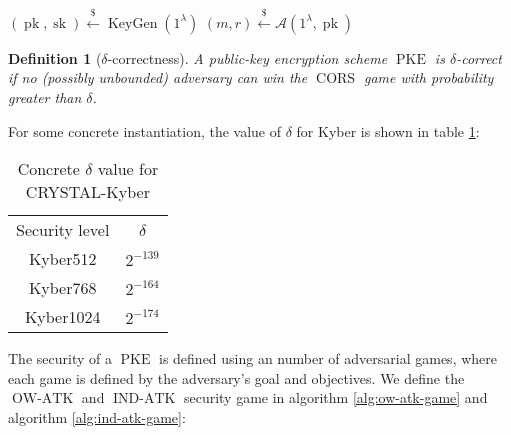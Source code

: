 \documentclass{article}
\newcommand{\leftsample}{\overset{{\scriptscriptstyle\$}}{\leftarrow}}
\newcommand{\keygen}{\operatorname{KeyGen}}
\newcommand{\pk}{\operatorname{pk}}
\newcommand{\sk}{\operatorname{sk}}
\newcommand{\pke}{\operatorname{PKE}}
\newcommand{\cors}{\operatorname{CORS}}
\newcommand{\llbrack}{[\![}
\newcommand{\rrbrack}{]\!]}
\newtheorem{definition}{Definition}[section]
\begin{document}
\begin{algorithm}[H]
    \caption{The correctness game $\cors$}
    $(\pk, \sk) \leftsample \keygen(1^\lambda)$\;
    $(m, r) \leftsample \mathcal{A}(1^\lambda, \pk)$\;
    \Return{
        $\llbrack D(\sk, E(\pk, m; r)) \neq m \rrbrack$
    }
\end{algorithm}

\begin{definition}[$\delta$-correctness]\label{def:delta-correctness}
    A public-key encryption scheme $\pke$ is $\delta$-correct if no (possibly unbounded) adversary can win the $\cors$ game with probability greater than $\delta$.
\end{definition}

For some concrete instantiation, the value of $\delta$ for Kyber\cite{avanzi2019crystals} is shown in table \ref{table:kyber-delta-vals}:

\begin{table}
    \centering
    \begin{tabular}{cc}
        Security level & $\delta$ \\
        Kyber512 & $2^{-139}$ \\
        Kyber768 & $2^{-164}$ \\
        Kyber1024 & $2^{-174}$ \\
    \end{tabular}
    \caption{Concrete $\delta$ value for CRYSTAL-Kyber}
    \label{table:kyber-delta-vals}
\end{table}


The security of a $\pke$ is defined using an number of adversarial games, where each game is defined by the adversary's goal and objectives. We define the $\operatorname{OW-ATK}$ and $\operatorname{IND-ATK}$ security game in algorithm \ref{alg:ow-atk-game} and algorithm \ref{alg:ind-atk-game}:
\end{document}
